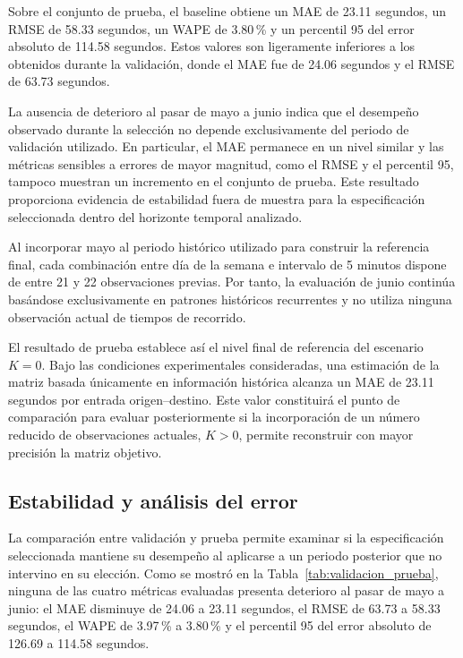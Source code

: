 \documentclass[11pt]{article}
\begin{document}
Sobre el conjunto de prueba, el baseline obtiene un MAE de 23.11 segundos, un RMSE de 58.33 segundos, un WAPE de 3.80\,\% y un percentil 95 del error absoluto de 114.58 segundos. Estos valores son ligeramente inferiores a los obtenidos durante la validación, donde el MAE fue de 24.06 segundos y el RMSE de 63.73 segundos.

La ausencia de deterioro al pasar de mayo a junio indica que el desempeño observado durante la selección no depende exclusivamente del periodo de validación utilizado. En particular, el MAE permanece en un nivel similar y las métricas sensibles a errores de mayor magnitud, como el RMSE y el percentil 95, tampoco muestran un incremento en el conjunto de prueba. Este resultado proporciona evidencia de estabilidad fuera de muestra para la especificación seleccionada dentro del horizonte temporal analizado.

Al incorporar mayo al periodo histórico utilizado para construir la referencia final, cada combinación entre día de la semana e intervalo de 5 minutos dispone de entre 21 y 22 observaciones previas. Por tanto, la evaluación de junio continúa basándose exclusivamente en patrones históricos recurrentes y no utiliza ninguna observación actual de tiempos de recorrido.

El resultado de prueba establece así el nivel final de referencia del escenario $K=0$. Bajo las condiciones experimentales consideradas, una estimación de la matriz basada únicamente en información histórica alcanza un MAE de 23.11 segundos por entrada origen--destino. Este valor constituirá el punto de comparación para evaluar posteriormente si la incorporación de un número reducido de observaciones actuales, $K>0$, permite reconstruir con mayor precisión la matriz objetivo.

\subsection{Estabilidad y análisis del error}

La comparación entre validación y prueba permite examinar si la especificación seleccionada mantiene su desempeño al aplicarse a un periodo posterior que no intervino en su elección. Como se mostró en la Tabla~\ref{tab:validacion_prueba}, ninguna de las cuatro métricas evaluadas presenta deterioro al pasar de mayo a junio: el MAE disminuye de 24.06 a 23.11 segundos, el RMSE de 63.73 a 58.33 segundos, el WAPE de 3.97\,\% a 3.80\,\% y el percentil 95 del error absoluto de 126.69 a 114.58 segundos.
\end{document}
